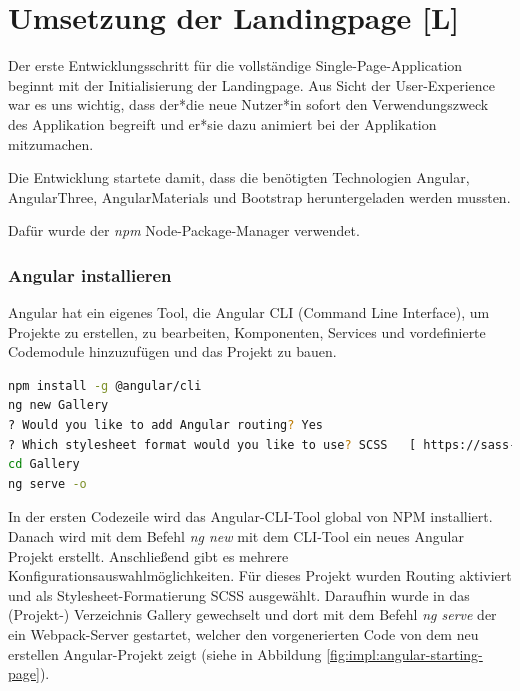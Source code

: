 \section{Umsetzung der Landingpage [L]}
\label{landingpage implentation}

Der erste Entwicklungsschritt für die vollständige Single-Page-Application beginnt mit der Initialisierung der Landingpage. Aus Sicht der User-Experience war es uns wichtig, dass der*die neue Nutzer*in sofort den Verwendungszweck des Applikation begreift und er*sie dazu animiert bei der Applikation mitzumachen. 

Die Entwicklung startete damit, dass die benötigten Technologien Angular, AngularThree, AngularMaterials und Bootstrap heruntergeladen werden mussten.

Dafür wurde der \emph{npm} Node-Package-Manager verwendet.

\subsubsection{Angular installieren}\label{sec:AngularCLI}
Angular hat ein eigenes Tool, die Angular CLI (Command Line Interface), um Projekte zu erstellen, zu bearbeiten, Komponenten, Services und vordefinierte Codemodule hinzuzufügen und das Projekt zu bauen.

\begin{lstlisting}[caption={{Terminalm - Angular aufsetzen, Installation der CLI, Configuration eines neuen Projektes, Starten des Projektes}},language=bash]
npm install -g @angular/cli 
ng new Gallery
? Would you like to add Angular routing? Yes
? Which stylesheet format would you like to use? SCSS   [ https://sass-lang.com/documentation/syntax#scss ]
cd Gallery
ng serve -o
\end{lstlisting}

In der ersten Codezeile wird das Angular-CLI-Tool global von NPM installiert.
Danach wird mit dem Befehl \emph{ng new} mit dem CLI-Tool ein neues Angular Projekt erstellt. Anschließend gibt es mehrere Konfigurationsauswahlmöglichkeiten. Für dieses Projekt wurden Routing aktiviert und  als Stylesheet-Formatierung SCSS ausgewählt. Daraufhin wurde in das (Projekt-) Verzeichnis Gallery gewechselt und dort mit dem Befehl \emph{ng serve} der ein Webpack-Server gestartet, welcher den vorgenerierten Code von dem neu erstellen Angular-Projekt zeigt (siehe in Abbildung \ref{fig:impl:angular-starting-page}). 

